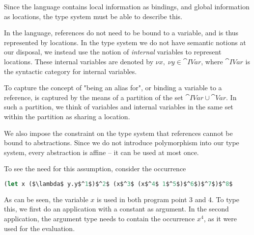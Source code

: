 \documentclass{llncs}
\begin{document}
Since the language contains local information as bindings, and global
information as locations, the type system must be able to describe
this.

In the language, references do not need to be bound to a variable, and is thus represented by locations.
In the type system we do not have semantic notions at our disposal, we instead use the notion of \emph{internal} variables to represent locations.
These internal variables are denoted by $\nu x,\; \nu y\in\cat{IVar}$, where $\cat{IVar}$ is the syntactic category for internal variables.

To capture the concept of "being an alias for", or binding a variable to a reference, is captured by the means of a partition of the set $\cat{IVar} \cup \cat{Var}$.
In such a partition, we think of variables and internal variables in the same set within the partition as sharing a location.



We also impose the constraint on the type system that references
cannot be bound to abstractions. Since we do not introduce
polymorphism into our type system, every abstraction is affine -- it
can be used at most once.

To see the need for this assumption, consider the occurrence
\begin{lstlisting}[language=Caml, mathescape=true]
(let x ($\lambda$ y.y$^1$)$^2$ (x$^3$ (x$^4$ 1$^5$)$^6$)$^7$)$^8$
\end{lstlisting}
As can be seen, the variable $x$ is used in both program point 3 and 4.
To type this, we first do an application with a constant as argument.
In the second application, the argument type needs to contain the occurrence $x^4$, as it were used for the evaluation.

\end{document}
